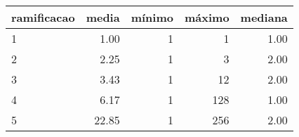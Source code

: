 \begin{table}[ht]
\centering
\begin{tabular}{lrrrr}
  \hline
ramificacao & media & mínimo & máximo & mediana \\ 
  \hline
1 & 1.00 &   1 &   1 & 1.00 \\ 
  2 & 2.25 &   1 &   3 & 2.00 \\ 
  3 & 3.43 &   1 &  12 & 2.00 \\ 
  4 & 6.17 &   1 & 128 & 1.00 \\ 
  5 & 22.85 &   1 & 256 & 2.00 \\ 
   \hline
\end{tabular}
\end{table}
